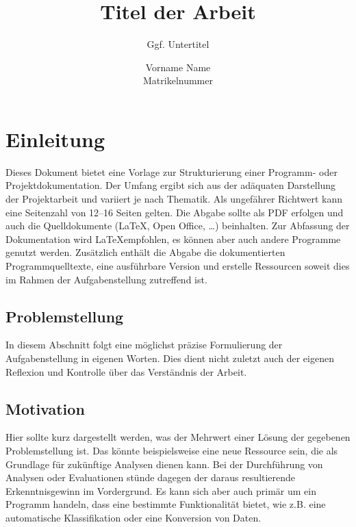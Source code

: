 \documentclass[pagesize=auto, titlepage=on]{scrartcl}
\begin{document}
\titlehead{Seminar XY \hfill Goethe-Universtität Frankfurt am Main}
\subject{Typisierung der Arbeit}
\author{Vorname Name \\ Matrikelnummer}
\title{Titel der Arbeit}
\subtitle{Ggf. Untertitel}
\publishers{Betreuer}

\maketitle

\tableofcontents

\section{Einleitung}
\label{sec:einleitung}
Dieses Dokument bietet eine Vorlage zur Strukturierung einer Programm- oder Projektdokumentation.
Der Umfang ergibt sich aus der adäquaten Darstellung der Projektarbeit und variiert je nach Thematik.
Als ungefährer Richtwert kann eine Seitenzahl von 12--16 Seiten gelten.
Die Abgabe sollte als PDF erfolgen und auch die Quelldokumente (\LaTeX, Open Office, \ldots) beinhalten.
Zur Abfassung der Dokumentation wird \LaTeX empfohlen, es können aber auch andere Programme genutzt werden.
Zusätzlich enthält die Abgabe die dokumentierten Programmquelltexte, eine ausführbare Version und erstelle Ressourcen
soweit dies im Rahmen der Aufgabenstellung zutreffend ist.

\subsection{Problemstellung}
\label{sec:problemstellung}
In diesem Abschnitt folgt eine möglichst präzise Formulierung der Aufgabenstellung in eigenen Worten.
Dies dient nicht zuletzt auch der eigenen Reflexion und Kontrolle über das Verständnis der Arbeit.

\subsection{Motivation}
\label{sec:motivation}
Hier sollte kurz dargestellt werden, was der Mehrwert einer Lösung der gegebenen Problemstellung ist.
Das könnte beispielsweise eine neue Ressource sein, die als Grundlage für zukünftige Analysen dienen kann.
Bei der Durchführung von Analysen oder Evaluationen stünde dagegen der daraus resultierende Erkenntnisgewinn im Vordergrund.
Es kann sich aber auch primär um ein Programm handeln, dass eine bestimmte Funktionalität bietet, wie z.B. eine automatische Klassifikation oder eine Konversion von Daten.
\end{document}
